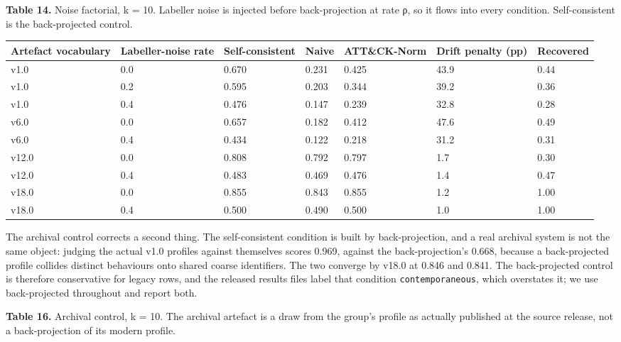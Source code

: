 \documentclass[11pt,a4paper]{article}
\begin{document}
\textbf{Table 14.} Noise factorial, k = 10. Labeller noise is injected before back-projection at rate ρ, so it flows into every condition. Self-consistent is the back-projected control.

\begin{center}\footnotesize
\begin{tabular}{lllllll}
\toprule
Artefact vocabulary & Labeller-noise rate & Self-consistent & Naive & ATT\&CK-Norm & Drift penalty (pp) & Recovered \\
\midrule
v1.0 & 0.0 & 0.670 & 0.231 & 0.425 & 43.9 & 0.44 \\
v1.0 & 0.2 & 0.595 & 0.203 & 0.344 & 39.2 & 0.36 \\
v1.0 & 0.4 & 0.476 & 0.147 & 0.239 & 32.8 & 0.28 \\
v6.0 & 0.0 & 0.657 & 0.182 & 0.412 & 47.6 & 0.49 \\
v6.0 & 0.4 & 0.434 & 0.122 & 0.218 & 31.2 & 0.31 \\
v12.0 & 0.0 & 0.808 & 0.792 & 0.797 & 1.7 & 0.30 \\
v12.0 & 0.4 & 0.483 & 0.469 & 0.476 & 1.4 & 0.47 \\
v18.0 & 0.0 & 0.855 & 0.843 & 0.855 & 1.2 & 1.00 \\
v18.0 & 0.4 & 0.500 & 0.490 & 0.500 & 1.0 & 1.00 \\
\bottomrule
\end{tabular}
\end{center}

The archival control corrects a second thing. The self-consistent condition is built by back-projection, and a real archival system is not the same object: judging the actual v1.0 profiles against themselves scores 0.969, against the back-projection's 0.668, because a back-projected profile collides distinct behaviours onto shared coarse identifiers. The two converge by v18.0 at 0.846 and 0.841. The back-projected control is therefore conservative for legacy rows, and the released results files label that condition \texttt{contemporaneous}, which overstates it; we use back-projected throughout and report both.

\textbf{Table 16.} Archival control, k = 10. The archival artefact is a draw from the group's profile as actually published at the source release, not a back-projection of its modern profile.
\end{document}
